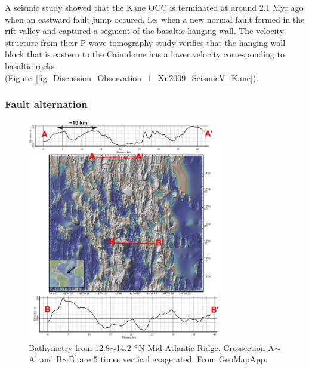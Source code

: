 A seismic study \citep{Xu2009} showed that the Kane OCC is terminated at around 2.1 Myr ago when an eastward fault jump occured, i.e. when a new normal fault formed in the rift valley and captured a segment of the basaltic hanging wall. The velocity structure from their P wave tomography study verifies that the hanging wall block that is eastern to the Cain dome has a lower velocity corresponding to basaltic rocks (Figure~\hyperref[fig_Discussion_Observation_1_Xu2009_SeismicV_Kane]{\ref{fig_Discussion_Observation_1_Xu2009_SeismicV_Kane}}).

\subsubsection{Fault alternation}

\begin{figure}[h]
 \centering
  \includegraphics[width=0.75\textwidth]{./Figures/fig_Discussion_Observation_2_13-14N_MAR.eps}
 \caption[Bathymetry from 12.8$\sim$14.2 $\degree$N Mid-Atlantic Ridge.]{Bathymetry from 12.8$\sim$14.2 $\degree$N Mid-Atlantic Ridge. Crossection A$\sim$A$^{\prime}$ and B$\sim$B$^{\prime}$ are 5 times vertical exagerated. From GeoMapApp.}
 \label{fig_Discussion_Observation_2_13-14N_MAR}
\end{figure}

